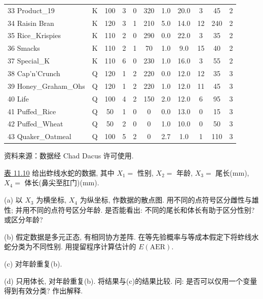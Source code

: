 \begin{mvtable}
\begin{longtable}{lcccccccccc}
33 Product\_19 & K & 100 & 3 & 0 & 320 & 1.0 & 20.0 & 3 & 45 & 2\\
34 Raisin Bran & K & 120 & 3 & 1 & 210 & 5.0 & 14.0 & 12 & 240 & 2\\
35 Rice\_Krispies & K & 110 & 2 & 0 & 290 & 0.0 & 22.0 & 3 & 35 & 2\\
36 Smacks & K & 110 & 2 & 1 & 70 & 1.0 & 9.0 & 15 & 40 & 2\\
37 Special\_K & K & 110 & 6 & 0 & 230 & 1.0 & 16.0 & 3 & 55 & 2\\
38 Cap'n'Crunch & Q & 120 & 1 & 2 & 220 & 0.0 & 12.0 & 12 & 35 & 3\\
39 Honey\_Graham\_Ohs & Q & 120 & 1 & 2 & 220 & 1.0 & 12.0 & 11 & 45 & 3\\
40 Life & Q & 100 & 4 & 2 & 150 & 2.0 & 12.0 & 6 & 95 & 3\\
41 Puffed\_Rice & Q & 50 & 1 & 0 & 0 & 0.0 & 13.0 & 0 & 15 & 3\\
42 Puffed\_Wheat & Q & 50 & 2 & 0 & 0 & 1.0 & 10.0 & 0 & 50 & 3\\
43 Quaker\_Oatmeal & Q & 100 & 5 & 2 & 0 & 2.7 & 1.0 & 1 & 110 & 3\\
\end{longtable}

\vspace{0.3em}
\noindent 资料来源：数据经 Chad Dacus 许可使用.
\end{mvtable}

\quad \hyperref[tab:11.10]{表 11.10} 给出蚱线水蛇的数据, 其中 $X_1=$ 性别, $X_2=$ 年龄, $X_3=$ 尾长(mm), $X_4=$ 体长(鼻尖至肛门)(mm).

(a) 以 $X_3$ 为横坐标, $X_4$ 为纵坐标, 作数据的散点图. 用不同的点符号区分雌性与雄性; 并用不同的点符号区分年龄. 是否能看出: 不同的尾长和体长有助于区分性别? 或区分年龄?

(b) 假定数据是多元正态, 有相同协方差阵. 在等先验概率与等成本假定下将蚱线水蛇分类为不同性别. 用提留程序计算估计的 $E(\mathrm{AER})$.

(c) 对年龄重复(b).

(d) 只用体长, 对年龄重复(b). 将结果与(c)的结果比较. 问: 是否可以仅用一个变量得到有效分类? 作出解释.
